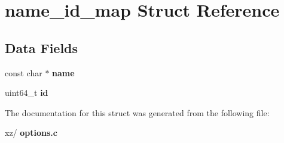 \section{name\+\_\+id\+\_\+map Struct Reference}
\label{structname__id__map}
\subsection*{Data Fields}
\begin{DoxyCompactItemize}
\item 
\mbox{\label{structname__id__map_a962b8d1fce6d3caa766b94e6f6bb920d}} 
const char $\ast$ {\bfseries name}
\item 
\mbox{\label{structname__id__map_a7f9b230a51d75dbcce8d8420578fee09}} 
uint64\+\_\+t {\bfseries id}
\end{DoxyCompactItemize}


The documentation for this struct was generated from the following file\+:\begin{DoxyCompactItemize}
\item 
xz/\textbf{ options.\+c}\end{DoxyCompactItemize}
